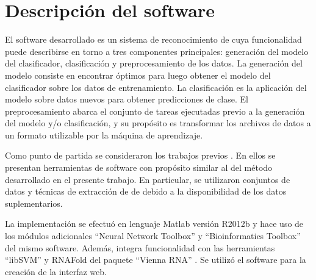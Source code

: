 %
%
%
%
\chapter{Descripción del software}
%
El software desarrollado es un sistema de reconocimiento de
 cuya funcionalidad puede describirse en torno a tres
componentes principales: generación del modelo del clasificador,
clasificación y preprocesamiento de los datos. La generación del
modelo consiste en encontrar  óptimos para luego obtener el
modelo del clasificador sobre los datos de entrenamiento.  La
clasificación es la aplicación del modelo sobre datos nuevos para
obtener predicciones de clase. El preprocesamiento abarca el conjunto
de tareas ejecutadas previo a la generación del modelo y/o
clasificación, y su propósito es transformar los archivos de datos a
un formato utilizable por la máquina de aprendizaje.

Como punto de partida se consideraron los trabajos previos
\cite{xue,ng,batuwita,sheng,sewer,ding}. En ellos se presentan
herramientas de software con propósito similar al del método
desarrollado en el presente trabajo. En particular, se utilizaron
conjuntos de datos y técnicas de extracción de  de
\cite{xue,ng,batuwita} debido a la disponibilidad de los datos
suplementarios.

La implementación se efectuó en lenguaje Matlab versión R2012b y hace
uso de los módulos adicionales ``Neural Network Toolbox'' y
``Bioinformatics Toolbox'' del mismo software. Además, integra
funcionalidad con las herramientas ``libSVM'' \cite{libsvm} y RNAFold
del paquete ``Vienna RNA'' \cite{vienna}. Se utilizó el software
\cite{webdemobuilder} para la creación de la interfaz web.

